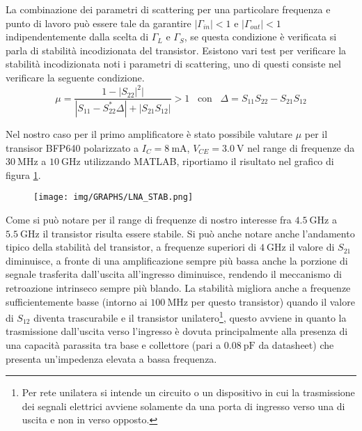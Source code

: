 \documentclass[12pt,oneside]{book}
\begin{document}
La combinazione dei parametri di scattering per una particolare frequenza e punto di lavoro può essere tale da garantire $\left|\Gamma_{in}\right| < 1$ e $\left|\Gamma_{out}\right| < 1$ indipendentemente dalla scelta di $\Gamma_{L}$ e $\Gamma_{S}$, se questa condizione è verificata si parla di stabilità incodizionata del transistor. Esistono vari test per verificare la stabilità incodizionata noti i parametri di scattering, uno di questi consiste nel verificare la seguente condizione.
\begin{equation}
    \mu = \dfrac{1-\left|S_{22}\right|^2|}{\left|S_{11}-S_{22}^{*}\Delta\right|+\left|S_{21}S_{12}\right|}> 1 \hspace{10pt} \text{con} \hspace{10pt} \Delta=S_{11}S_{22}-S_{21}S_{12}
\end{equation}

Nel nostro caso per il primo amplificatore è stato possibile valutare $\mu$ per il transisor BFP640 polarizzato a $I_{C}=\SI{8}{\milli\ampere}$, $V_{CE}=\SI{3.0}{\volt}$ nel range di frequenze da $\SI{30}{\mega\hertz}$ a $\SI{10}{\giga\hertz}$ utilizzando MATLAB, riportiamo il risultato nel grafico di figura \ref{stab_test}.
\begin{figure}[!htbp]
    \centering
        \texttt{[image: img/GRAPHS/LNA\_STAB.png]}
        \caption{}
        \label{stab_test}
\end{figure}

Come si può notare per il range di frequenze di nostro interesse fra $\SI{4.5}{\giga\hertz}$ a $\SI{5.5}{\giga\hertz}$ il transistor risulta essere stabile. Si può anche notare anche l'andamento tipico della stabilità del transistor, a frequenze superiori di $\SI{4}{\giga\hertz}$ il valore di $S_{21}$ diminuisce, a fronte di una amplificazione sempre più bassa anche la porzione di segnale trasferita dall'uscita all'ingresso diminuisce, rendendo il meccanismo di retroazione intrinseco sempre più blando. La stabilità migliora anche a frequenze sufficientemente basse (intorno ai $\SI{100}{\mega\hertz}$ per questo transistor) quando il valore di $S_{12}$ diventa trascurabile e il transistor unilatero\footnote{Per rete unilatera si intende un circuito o un dispositivo in cui la trasmissione dei segnali elettrici avviene solamente da una porta di ingresso verso una di uscita e non in verso opposto.}, questo avviene in quanto la trasmissione dall'uscita verso l'ingresso è dovuta principalmente alla presenza di una capacità parassita tra base e collettore (pari a $\SI{0.08}{\pico\farad}$ da datasheet) che presenta un'impedenza elevata a bassa frequenza.
\end{document}
